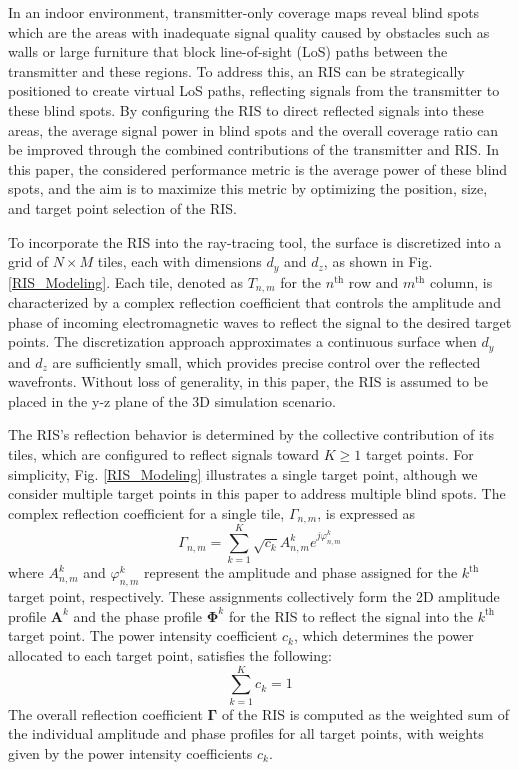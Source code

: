 \documentclass{IEEEoj}
\begin{document}
In an indoor environment, transmitter-only coverage maps reveal blind spots which are the areas with inadequate signal quality caused by obstacles such as walls or large furniture that block line-of-sight (LoS) paths between the transmitter and these regions. To address this, an RIS can be strategically positioned to create virtual LoS paths, reflecting signals from the transmitter to these blind spots. By configuring the RIS to direct reflected signals into these areas, the average signal power in blind spots and the overall coverage ratio can be improved through the combined contributions of the transmitter and RIS. In this paper, the considered performance metric is the average power of these blind spots, and the aim is to maximize this metric by optimizing the position, size, and target point selection of the RIS.

To incorporate the RIS into the ray-tracing tool, the surface is discretized into a grid of $N \times M$ tiles, each with dimensions $d_y$ and $d_z$, as shown in Fig. \ref{RIS_Modeling}. Each tile, denoted as $T_{n,m}$ for the $n^{\text{th}}$ row and $m^{\text{th}}$ column, is characterized by a complex reflection coefficient that controls the amplitude and phase of incoming electromagnetic waves to reflect the signal to the desired target points. The discretization approach approximates a continuous surface when $d_y$ and $d_z$ are sufficiently small, which provides precise control over the reflected wavefronts. Without loss of generality, in this paper, the RIS is assumed to be placed in the y-z plane of the 3D simulation scenario.

The RIS's reflection behavior is determined by the collective contribution of its tiles, which are configured to reflect signals toward $K \geq 1$ target points. For simplicity, Fig. \ref{RIS_Modeling} illustrates a single target point, although we consider multiple target points in this paper to address multiple blind spots. The complex reflection coefficient for a single tile, $\Gamma_{n,m}$, is expressed as
\begin{equation} \label{ref_coef_exp}
	\Gamma_{n,m} = \sum \limits_{k=1}^K \sqrt{c_k} A_{n,m}^k e^{j \varphi_{n,m}^k}
\end{equation}
where $A_{n,m}^k$ and $\varphi_{n,m}^k$ represent the amplitude and phase assigned for the $k^{\text{th}}$ target point, respectively. These assignments collectively form the 2D amplitude profile $\mathbf{A}^k$ and the phase profile $\mathbf{\Phi}^k$ for the RIS to reflect the signal into the $k^{\text{th}}$ target point. The power intensity coefficient $c_k$, which determines the power allocated to each target point, satisfies the following:
\begin{equation}
	\sum_{k=1}^K c_k = 1
\end{equation}
The overall reflection coefficient $\mathbf{\Gamma}$ of the RIS is computed as the weighted sum of the individual amplitude and phase profiles for all target points, with weights given by the power intensity coefficients $c_k$.
\end{document}
